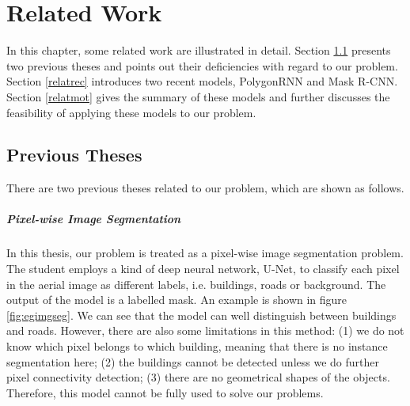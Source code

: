 \chapter{Related Work}

In this chapter, some related work are illustrated in detail. Section \ref{relatpre} presents two previous theses and points out their deficiencies with regard to our problem. Section \ref{relatrec} introduces two recent models, PolygonRNN and Mask R-CNN. Section \ref{relatmot} gives the summary of these models and further discusses the feasibility of applying these models to our problem.

\section{Previous Theses}\label{relatpre}

There are two previous theses related to our problem, which are shown as follows.

\paragraph{Pixel-wise Image Segmentation}
In this thesis, our problem is treated as a pixel-wise image segmentation problem. The student employs a kind of deep neural network, U-Net, to classify each pixel in the aerial image as different labels, i.e. buildings, roads or background. The output of the model is a labelled mask. An example is shown in figure \ref{fig:egimgseg}. We can see that the model can well distinguish between buildings and roads. However, there are also some limitations in this method: (1) we do not know which pixel belongs to which building, meaning that there is no instance segmentation here; (2) the buildings cannot be detected unless we do further pixel connectivity detection; (3) there are no geometrical shapes of the objects. Therefore, this model cannot be fully used to solve our problems.

